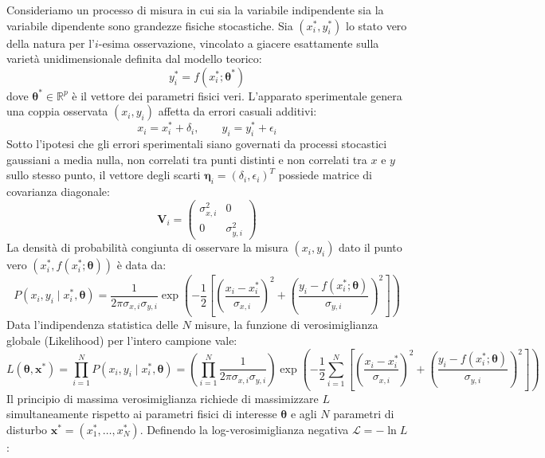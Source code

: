 \documentclass[11pt,a4paper]{article}
\begin{document}
Consideriamo un processo di misura in cui sia la variabile indipendente sia la variabile dipendente sono grandezze fisiche stocastiche. Sia $(x_i^*, y_i^*)$ lo stato vero della natura per l'$i$-esima osservazione, vincolato a giacere esattamente sulla varietà unidimensionale definita dal modello teorico:
\begin{equation}
    y_i^* = f(x_i^*; \boldsymbol{\theta}^*)
\end{equation}
dove $\boldsymbol{\theta}^* \in \mathbb{R}^p$ è il vettore dei parametri fisici veri. L'apparato sperimentale genera una coppia osservata $(x_i, y_i)$ affetta da errori casuali additivi:
\begin{equation}
    x_i = x_i^* + \delta_i, \qquad y_i = y_i^* + \epsilon_i
\end{equation}
Sotto l'ipotesi che gli errori sperimentali siano governati da processi stocastici gaussiani a media nulla, non correlati tra punti distinti e non correlati tra $x$ e $y$ sullo stesso punto, il vettore degli scarti $\bm{\eta}_i = (\delta_i, \epsilon_i)^T$ possiede matrice di covarianza diagonale:
\begin{equation}
    \mathbf{V}_i = \begin{pmatrix} \sigma_{x, i}^2 & 0 \\ 0 & \sigma_{y, i}^2 \end{pmatrix}
\end{equation}
La densità di probabilità congiunta di osservare la misura $(x_i, y_i)$ dato il punto vero $(x_i^*, f(x_i^*; \boldsymbol{\theta}))$ è data da:
\begin{equation}
    P(x_i, y_i \mid x_i^*, \boldsymbol{\theta}) = \frac{1}{2\pi \sigma_{x, i} \sigma_{y, i}} \exp\left( -\frac{1}{2} \left[ \left(\frac{x_i - x_i^*}{\sigma_{x, i}}\right)^2 + \left(\frac{y_i - f(x_i^*; \boldsymbol{\theta})}{\sigma_{y, i}}\right)^2 \right] \right)
\end{equation}
Data l'indipendenza statistica delle $N$ misure, la funzione di verosimiglianza globale (Likelihood) per l'intero campione vale:
\begin{equation}
    L(\boldsymbol{\theta}, \mathbf{x}^*) = \prod_{i=1}^N P(x_i, y_i \mid x_i^*, \boldsymbol{\theta}) = \left( \prod_{i=1}^N \frac{1}{2\pi \sigma_{x, i} \sigma_{y, i}} \right) \exp\left( -\frac{1}{2} \sum_{i=1}^N \left[ \left(\frac{x_i - x_i^*}{\sigma_{x, i}}\right)^2 + \left(\frac{y_i - f(x_i^*; \boldsymbol{\theta})}{\sigma_{y, i}}\right)^2 \right] \right)
\end{equation}
Il principio di massima verosimiglianza richiede di massimizzare $L$ simultaneamente rispetto ai parametri fisici di interesse $\boldsymbol{\theta}$ e agli $N$ parametri di disturbo $\mathbf{x}^* = (x_1^*, \dots, x_N^*)$. Definendo la log-verosimiglianza negativa $\mathcal{L} = -\ln L$:
\end{document}

